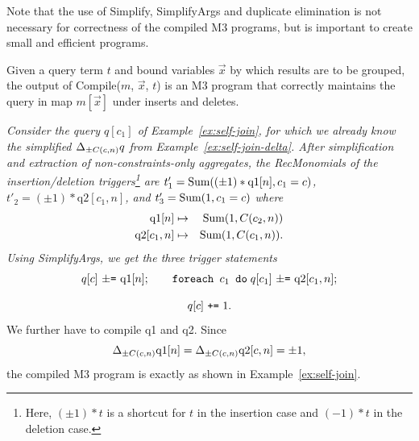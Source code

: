 Note that the use of Simplify, SimplifyArgs and duplicate elimination
is not necessary for correctness of the compiled M3 programs, but is important
to create small and efficient programs.


\begin{theorem}
Given a query term $t$ and bound variables $\vec{x}$ by which results
are to be grouped,
the output of Compile($m$, $\vec{x}$, $t$) is an M3 program that
correctly maintains the query in map $m[\vec{x}]$ under inserts and deletes.
\end{theorem}



\begin{example}\em
\label{ex:self-join-compile}
Consider the query $q[c_1]$ of
Example~\ref{ex:self-join}, for which we already know
the simplified $\Delta_{\pm C(c,n)} q$ from Example~\ref{ex:self-join-delta}.
After simplification and extraction of non-constraints-only aggregates,
the RecMonomials of the insertion/deletion triggers\footnote{Here,
$(\pm 1) * t$ is a shortcut for $t$ in the insertion case and
$(-1)*t$ in the deletion case.} are
$t'_1 = \mbox{Sum}((\pm 1) * \mbox{q1}[n], c_1=c)$,
$t'_2 = (\pm 1) * \mbox{q2}[c_1, n]$, and
$t'_3 = \mbox{Sum}(1, c_1=c)$
where
\begin{eqnarray*}
\mbox{q1}[n] &\mapsto& \mbox{Sum}(1, C(c_2, n)) \\
\mbox{q2}[c_1, n] &\mapsto& \mbox{Sum}(1, C(c_1,n)).
\end{eqnarray*}
Using SimplifyArgs, we get the three trigger statements
\[
q[c] \mbox{ {\tt $\pm$=} q1}[n]; \quad\quad
\mbox{{\tt foreach $c_1$ do}} \; q[c_1] \mbox{ {\tt $\pm$=} q2}[c_1, n];
\]

\vspace{-6mm}

\[
q[c] \mbox{ {\tt +=} } 1.
\]
We further have to compile q1 and q2. Since
\[
\Delta_{\pm C(c,n)} \mbox{q1}[n] = \Delta_{\pm C(c,n)} \mbox{q2}[c,n] = \pm 1,
\]
the compiled M3 program is exactly as shown in Example~\ref{ex:self-join}.
\punto
\end{example}




